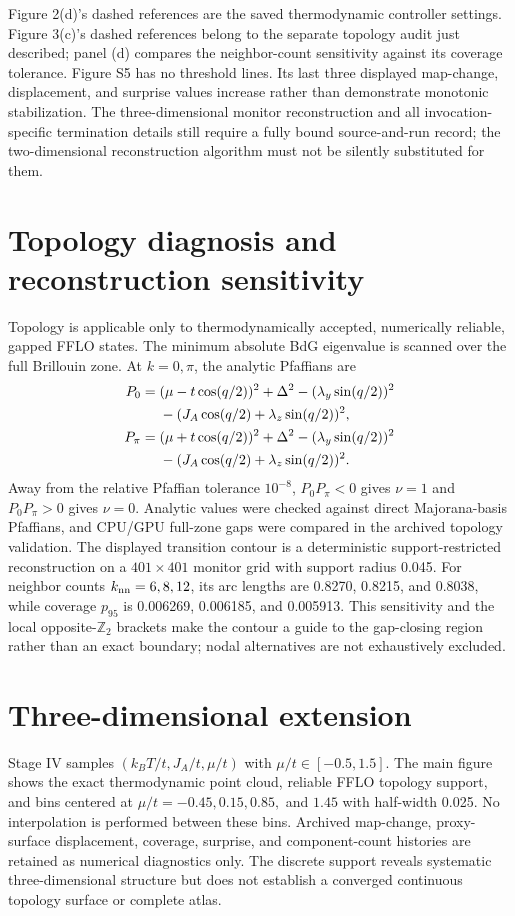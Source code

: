 Figure 2(d)'s dashed references are the saved thermodynamic controller settings. Figure 3(c)'s dashed references belong to the separate topology audit just described; panel (d) compares the neighbor-count sensitivity against its coverage tolerance. Figure S5 has no threshold lines. Its last three displayed map-change, displacement, and surprise values increase rather than demonstrate monotonic stabilization. The three-dimensional monitor reconstruction and all invocation-specific termination details still require a fully bound source-and-run record; the two-dimensional reconstruction algorithm must not be silently substituted for them.

\section{Topology diagnosis and reconstruction sensitivity}\label{sec:topology}
Topology is applicable only to thermodynamically accepted, numerically reliable, gapped FFLO states.  The minimum absolute BdG eigenvalue is scanned over the full Brillouin zone.  At $k=0,\pi$, the analytic Pfaffians are
\begin{align}P_0={}&(\mu-t\cos(q/2))^2+\Delta^2-(\lambda_y\sin(q/2))^2\notag\\ &-(J_A\cos(q/2)+\lambda_z\sin(q/2))^2,\\ P_\pi={}&(\mu+t\cos(q/2))^2+\Delta^2-(\lambda_y\sin(q/2))^2\notag\\ &-(J_A\cos(q/2)+\lambda_z\sin(q/2))^2.\end{align}
Away from the relative Pfaffian tolerance $10^{-8}$, $P_0P_\pi<0$ gives $\nu=1$ and $P_0P_\pi>0$ gives $\nu=0$. Analytic values were checked against direct Majorana-basis Pfaffians, and CPU/GPU full-zone gaps were compared in the archived topology validation. The displayed transition contour is a deterministic support-restricted reconstruction on a $401\times401$ monitor grid with support radius 0.045.  For neighbor counts $k_{\rm nn}=6,8,12$, its arc lengths are 0.8270, 0.8215, and 0.8038, while coverage $p_{95}$ is 0.006269, 0.006185, and 0.005913. This sensitivity and the local opposite-$\mathbb Z_2$ brackets make the contour a guide to the gap-closing region rather than an exact boundary; nodal alternatives are not exhaustively excluded.

\section{Three-dimensional extension}\label{sec:3d}
Stage IV samples $(k_BT/t,J_A/t,\mu/t)$ with $\mu/t\in[-0.5,1.5]$. The main figure shows the exact thermodynamic point cloud, reliable FFLO topology support, and bins centered at $\mu/t=-0.45,0.15,0.85,$ and $1.45$ with half-width 0.025. No interpolation is performed between these bins. Archived map-change, proxy-surface displacement, coverage, surprise, and component-count histories are retained as numerical diagnostics only. The discrete support reveals systematic three-dimensional structure but does not establish a converged continuous topology surface or complete atlas.


